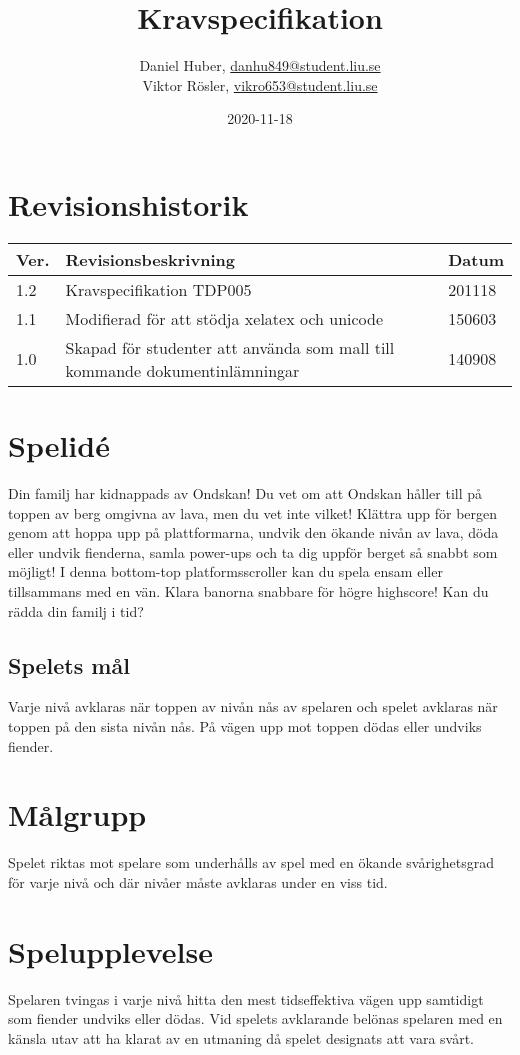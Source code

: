\documentclass{TDP005mall}
\author{Daniel Huber, \url{danhu849@student.liu.se}\\
  Viktor Rösler, \url{vikro653@student.liu.se}}
\title{Kravspecifikation}
\date{2020-11-18}
\begin{document}
\projectpage
\tableofcontents
\section{Revisionshistorik}
\begin{table}[!h]
\begin{tabularx}{\linewidth}{|l|X|l|}
\hline
Ver. & Revisionsbeskrivning & Datum \\\hline
1.2 & Kravspecifikation TDP005 & 201118 \\\hline
1.1 & Modifierad för att stödja xelatex och unicode & 150603 \\\hline
1.0 & Skapad för studenter att använda som mall till
kommande dokumentinlämningar & 140908 \\\hline
\end{tabularx}
\end{table}


\section{Spelid\'{e} }%
Din familj har kidnappads av Ondskan! Du vet om att Ondskan håller till på toppen av berg omgivna av lava, men du vet inte vilket! Klättra upp för bergen genom att hoppa upp på plattformarna, undvik den ökande nivån av lava, döda eller undvik fienderna, samla power-ups och ta dig uppför berget så snabbt som möjligt! I denna bottom-top platformsscroller kan du spela ensam eller tillsammans med en vän. Klara banorna snabbare för högre highscore! Kan du rädda din familj i tid?

\subsection{Spelets mål}
Varje nivå avklaras när toppen av nivån nås av spelaren och spelet avklaras när toppen på den sista nivån nås. På vägen upp mot toppen dödas eller undviks fiender. 

\section{Målgrupp}%
Spelet riktas mot spelare som underhålls av spel med en ökande svårighetsgrad för varje nivå och där nivåer måste avklaras under en viss tid. 

\section{Spelupplevelse}%
Spelaren tvingas i varje nivå hitta den mest tidseffektiva vägen upp samtidigt som fiender undviks eller dödas. Vid spelets avklarande belönas spelaren med en känsla utav att ha klarat av en utmaning då spelet designats att vara svårt.  
\end{document}
